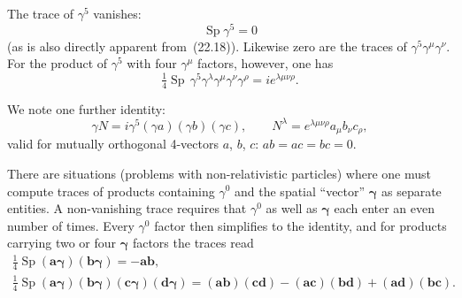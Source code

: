 The trace of $\gamma^5$ vanishes:
\begin{equation}
\operatorname{Sp}\gamma^5 = 0
\tag{22.19}
\end{equation}
(as is also directly apparent from~(22.18)). Likewise zero are the traces of $\gamma^5\gamma^\mu\gamma^\nu$. For the product of $\gamma^5$ with four $\gamma^\mu$ factors, however, one has
\begin{equation}
\tfrac{1}{4}\operatorname{Sp}\,\gamma^5\gamma^\lambda\gamma^\mu\gamma^\nu\gamma^\rho = ie^{\lambda\mu\nu\rho}.
\tag{22.20}
\end{equation}

We note one further identity:
\begin{equation}
\gamma N = i\gamma^5(\gamma a)(\gamma b)(\gamma c),\qquad N^\lambda = e^{\lambda\mu\nu\rho}a_\mu b_\nu c_\rho,
\tag{22.21}
\end{equation}
valid for mutually orthogonal 4-vectors $a$, $b$, $c$: $ab = ac = bc = 0$.

There are situations (problems with non-relativistic particles) where one must compute traces of products containing $\gamma^0$ and the spatial ``vector'' $\boldsymbol{\gamma}$ as separate entities. A non-vanishing trace requires that $\gamma^0$ as well as $\boldsymbol{\gamma}$ each enter an even number of times. Every $\gamma^0$ factor then simplifies to the identity, and for products carrying two or four $\boldsymbol{\gamma}$ factors the traces read
\begin{equation}
\begin{gathered}
\tfrac{1}{4}\operatorname{Sp}(\mathbf{a}\boldsymbol{\gamma})(\mathbf{b}\boldsymbol{\gamma}) = -\mathbf{ab},\\
\tfrac{1}{4}\operatorname{Sp}(\mathbf{a}\boldsymbol{\gamma})(\mathbf{b}\boldsymbol{\gamma})(\mathbf{c}\boldsymbol{\gamma})(\mathbf{d}\boldsymbol{\gamma}) = (\mathbf{ab})(\mathbf{cd}) - (\mathbf{ac})(\mathbf{bd}) + (\mathbf{ad})(\mathbf{bc}).
\end{gathered}
\tag{22.22}
\end{equation}

